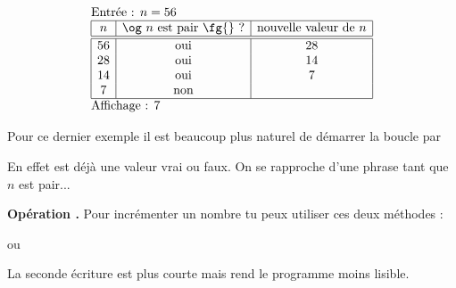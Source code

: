 \documentclass[11pt,class=report,crop=false]{standalone}
\begin{document}
\begin{cours}
\begin{exemple}
\begin{minipage}{0.4\textwidth}
\end{minipage}

  $$
  \begin{array}{l}
  \text{Entrée : $n=56$}    \\
  \begin{array}{|c|c|c|}
  \hline  
  n & \text{\og $n$ est pair \fg{} ?} & \text{nouvelle valeur de } n \\
  \hline\hline 
  56 & \text{oui} & 28 \\
  28 & \text{oui} & 14 \\
  14 & \text{oui} & 7 \\
  7 & \text{non} &  \\ 
  \hline
  \end{array} \\
  \text{Affichage : $7$}  
  \end{array} 
  $$ 
\medskip

Pour ce dernier exemple il est beaucoup plus naturel de démarrer la boucle par\\
\centerline{}
En effet  est déjà une valeur \og{}vrai\fg{} ou \ci{}faux\fg{}.
On se rapproche d'une phrase \og{}tant que $n$ est pair...\fg{}

\end{exemple}


\textbf{Opération \og{}\ci{+=}\fg{}.}
Pour incrémenter un nombre tu peux utiliser ces deux méthodes :\\
\centerline{ \qquad ou \qquad {}}
La seconde écriture est plus courte mais rend le programme moins lisible.
\end{cours}



\end{document}
